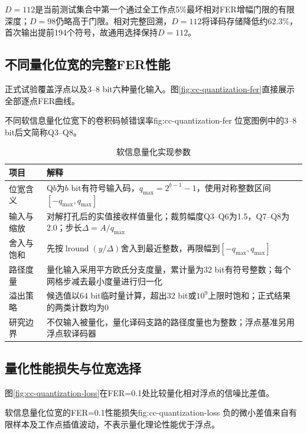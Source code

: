 $D=112$是当前测试集合中第一个通过全工作点5\%最坏相对FER增幅门限的有限深度；$D=98$仍略高于门限。相对完整回溯，$D=112$将译码存储降低约62.3\%，首次输出提前194个符号，故通用选择保持$D=112$。

\subsection{不同量化位宽的完整FER性能}

正式试验覆盖浮点以及3--8 bit六种量化输入。图\ref{fig:cc-quantization-fer}直接展示全部逐点FER曲线。

  {不同软信息量化位宽下的卷积码帧错误率}{fig:cc-quantization-fer}
  {位宽图例中的3--8 bit后文简称Q3--Q8。}

\begin{table}[htbp]
  \centering
  \small
  \caption{软信息量化实现参数}
  \label{tab:cc-quantization-rule}
  \begin{tabular}{p{}p{}}
    \toprule
    项目 & 解释 \\
    \midrule
    位宽含义 & Q$b$为$b$ bit有符号输入码，$q_{\max}=2^{b-1}-1$，使用对称整数区间$[-q_{\max},q_{\max}]$ \\
    输入与缩放 & 对解打孔后的实值接收样值量化；裁剪幅度Q3--Q6为1.5，Q7--Q8为2.0；步长$\Delta=A/q_{\max}$ \\
    舍入与饱和 & 先按$\operatorname{lround}(y/\Delta)$舍入到最近整数，再限幅到$[-q_{\max},q_{\max}]$ \\
    路径度量 & 量化输入采用平方欧氏分支度量，累计量为32 bit有符号整数；每个网格步减去最小度量进行归一化 \\
    溢出策略 & 候选值以64 bit临时量计算，超出32 bit或$10^9$上限时饱和；正式结果的两类计数均为0 \\
    研究边界 & 不仅输入被量化，量化译码支路的路径度量也为整数；浮点基准另用浮点软译码器 \\
    \bottomrule
  \end{tabular}
\end{table}

\subsection{量化性能损失与位宽选择}

图\ref{fig:cc-quantization-loss}在FER=0.1处比较量化相对浮点的信噪比差值。

  {软信息量化位宽的FER=0.1性能损失}{fig:cc-quantization-loss}
  {负的微小差值来自有限样本及工作点插值波动，不表示量化理论性能优于浮点。}

